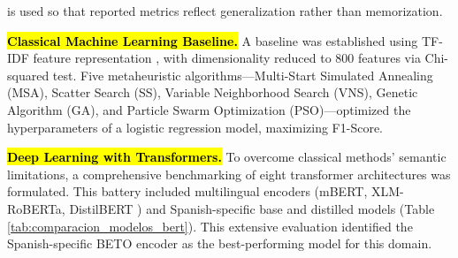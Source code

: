 \documentclass[informatics,article,accept,pdftex,moreauthors]{Definitions/mdpi}
\begin{document}
is used so that reported metrics reflect generalization rather than memorization.

\textbf{\hl{Classical Machine Learning Baseline.}} A baseline was established using TF-IDF feature representation \citep{shu2017fake}, with dimensionality reduced to 800 features via Chi-squared test. Five metaheuristic algorithms—Multi-Start Simulated Annealing (MSA), Scatter Search (SS), Variable Neighborhood Search (VNS), Genetic Algorithm (GA), and Particle Swarm Optimization (PSO)—optimized the hyperparameters of a logistic regression model, maximizing F1-Score.

\textbf{\hl{Deep Learning with Transformers.}} To overcome classical methods' semantic limitations, a comprehensive benchmarking of eight transformer architectures was formulated. This battery included multilingual encoders (mBERT, XLM-RoBERTa, DistilBERT \citep{sanh2019distilbert}) and Spanish-specific base and distilled models (Table \ref{tab:comparacion_modelos_bert}). This extensive evaluation identified the Spanish-specific BETO encoder as the best-performing model for this domain.
\end{document}
